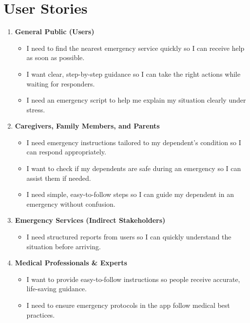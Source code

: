 \section{User Stories}
\label{section:user-stories}
\begin{enumerate}
    \item \textbf{General Public (Users)}
    \begin{itemize}
        \item I need to find the nearest emergency service quickly so I can receive help as soon as possible.
        \item I want clear, step-by-step guidance so I can take the right actions while waiting for responders.
        \item I need an emergency script to help me explain my situation clearly under stress.
    \end{itemize}
    
    \item \textbf{Caregivers, Family Members, and Parents}
    \begin{itemize}
        \item I need emergency instructions tailored to my dependent’s condition so I can respond appropriately.
        \item I want to check if my dependents are safe during an emergency so I can assist them if needed.
        \item I need simple, easy-to-follow steps so I can guide my dependent in an emergency without confusion.
    \end{itemize}

    \item \textbf{Emergency Services (Indirect Stakeholders)}
    \begin{itemize}
        \item I need structured reports from users so I can quickly understand the situation before arriving.
    \end{itemize}
    
    \item \textbf{Medical Professionals \& Experts}
    \begin{itemize}
        \item I want to provide easy-to-follow instructions so people receive accurate, life-saving guidance.
        \item I need to ensure emergency protocols in the app follow medical best practices.
    \end{itemize}
    

\end{enumerate}
